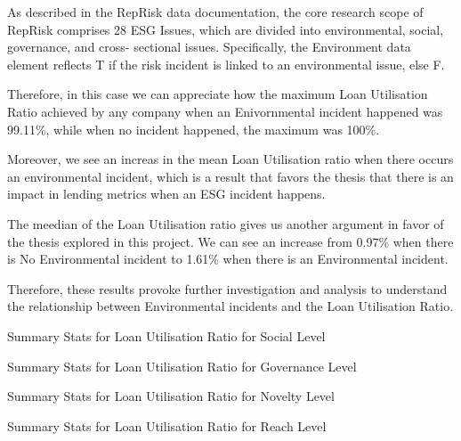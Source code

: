 As described in the RepRisk data documentation, the core research scope of RepRisk comprises 28 ESG Issues, which are divided into environmental, social, governance, and cross- sectional issues. Specifically, the Environment data element reflects T if the risk incident is linked to an environmental issue, else F.

Therefore, in this case we can appreciate how the maximum Loan Utilisation Ratio achieved by any company when an Enivornmental incident happened was 99.11\%, while when no incident happened, the maximum was 100\%.

Moreover, we see an increas in the mean Loan Utilisation ratio when there occurs an environmental incident, which is a result that favors the thesis that there is an impact in lending metrics when an ESG incident happens.

The meedian of the Loan Utilisation ratio gives us another argument in favor of the thesis explored in this project. We can see an increase from 0.97\% when there is No Environmental incident to 1.61\% when there is an Environmental incident.

Therefore, these results provoke further investigation and analysis to understand the relationship between Environmental incidents and the Loan Utilisation Ratio.

\begin{table}[H]
\caption{Summary Stats for Loan Utilisation Ratio for Social Level}
\centering

\label{table:loan_utilisation_ratio_social.tex}
\end{table}

\begin{table}[H]
\caption{Summary Stats for Loan Utilisation Ratio for Governance Level}
\centering

\label{table:loan_utilisation_ratio_governance.tex}
\end{table}


\begin{table}[H]
\caption{Summary Stats for Loan Utilisation Ratio for Novelty Level}
\centering

\label{table:loan_utilisation_ratio_novelty.tex}
\end{table}

\begin{table}[H]
\caption{Summary Stats for Loan Utilisation Ratio for Reach Level}
\centering

\label{table:loan_utilisation_ratio_reach.tex}
\end{table}

